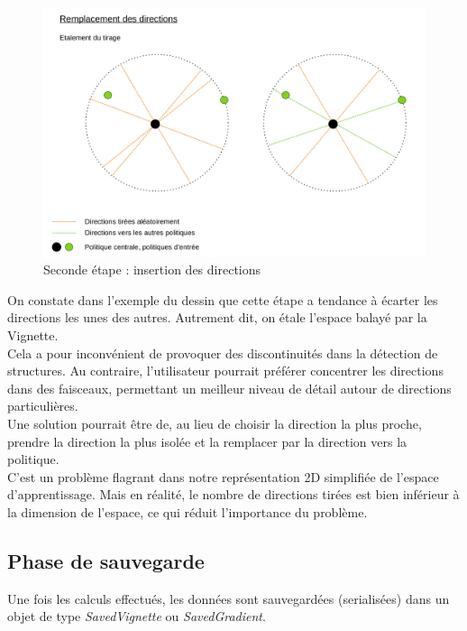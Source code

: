 \documentclass[12pt]{article}
\begin{document}
\begin{figure}[htp]
    \centering
    \includegraphics[width=15cm]{Images/vignette_portee2}
    \caption{Seconde étape : insertion des directions}
    \label{fig:vignettePortee}
\end{figure}

On constate dans l'exemple du dessin que cette étape a tendance à écarter les directions les unes des autres. Autrement dit, on étale l'espace balayé par la Vignette. \\

Cela a pour inconvénient de provoquer des discontinuités dans la détection de structures. Au contraire, l'utilisateur pourrait préférer concentrer les directions dans des faisceaux, permettant un meilleur niveau de détail autour de directions particulières. \\

Une solution pourrait être de, au lieu de choisir la direction la plus proche, prendre la direction la plus isolée et la remplacer par la direction vers la politique. \\

C'est un problème flagrant dans notre représentation 2D simplifiée de l'espace d'apprentissage. Mais en réalité, le nombre de directions tirées est bien inférieur à la dimension de l'espace, ce qui réduit l'importance du problème. \\

\subsection{Phase de sauvegarde}

Une fois les calculs effectués, les données sont sauvegardées (serialisées) dans un objet de type \emph{SavedVignette} ou \emph{SavedGradient}. \\
\end{document}
